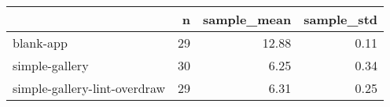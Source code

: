 \begin{tabular}{lrrr}
\toprule
{} &   n &  sample\_mean &  sample\_std \\
\midrule
blank-app                    &  29 &        12.88 &        0.11 \\
simple-gallery               &  30 &         6.25 &        0.34 \\
simple-gallery-lint-overdraw &  29 &         6.31 &        0.25 \\
\bottomrule
\end{tabular}
